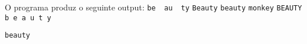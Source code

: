 \documentclass[12pt,varwidth=16cm,border=1pt]{standalone}
\begin{document}
O programa produz o seguinte output:
\newline 
\verb+be  au  ty+ \newline
\verb+Beauty+ \newline
\verb+beauty+ \verb+monkey+ \newline
\verb+BEAUTY+ \newline
\verb+b e a u t y + \newline

\verb+beauty+
\end{document}
